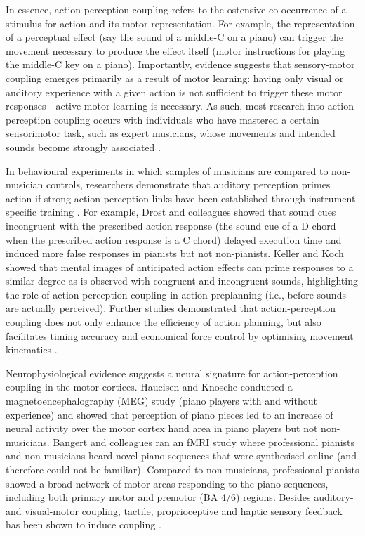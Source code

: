 \begin{CJK}{UTF8}{gbsn}
In essence, action-perception coupling refers to the ostensive co-occurrence of a stimulus for action and its motor representation.  For example, the representation of a perceptual effect (say the sound of a middle-C on a piano) can trigger the movement necessary to produce the effect itself (motor instructions for playing the middle-C key on a piano).   Importantly, evidence suggests that sensory-motor coupling emerges primarily as a result of motor learning: having only visual \citep{Candidi2014} or auditory \citep{Lahav2007} experience with a given action is not sufficient to trigger these motor responses—active motor learning is necessary.  As such, most research into action-perception coupling occurs with individuals who have mastered a certain sensorimotor task, such as expert musicians, whose movements and intended sounds become strongly associated \citep{Novembre2014}.

In behavioural experiments in which samples of musicians are compared to non-musician controls, researchers demonstrate that auditory perception primes action if strong action-perception links have been established through instrument-specific training \citep{Drost2005,Drost2005a,Drost2007}.  For example, Drost and colleagues showed that sound cues incongruent with the prescribed action response (the sound cue of a D chord when the prescribed action response is a C chord) delayed execution time \citep{Drost2005} and induced more false responses \citep[i.e., production of the heard chord, instead of the imperative one,][]{Drost2005a} in pianists but not non-pianists.  Keller and Koch \textcite{Keller2006} showed that mental images of anticipated action effects can prime responses to a similar degree as is observed with congruent and incongruent sounds, highlighting the role of action-perception coupling in action preplanning (i.e., before sounds are actually perceived).  Further studies demonstrated that action-perception coupling does not only enhance the efficiency of action planning, but also facilitates timing accuracy and economical force control by optimising movement kinematics \citep{Keller2010}.

Neurophysiological evidence suggests a neural signature for action-perception coupling in the motor cortices.  Haueisen and Knosche \citep{Haueisen2001} conducted a magnetoencephalography (MEG) study (piano players with and without experience) and showed that perception of piano pieces led to an increase of neural activity over the motor cortex hand area in piano players but not non-musicians.  Bangert and colleagues \textcite{Bangert2006} ran an fMRI study where professional pianists and non-musicians heard novel piano sequences that were synthesised online (and therefore could not be familiar).  Compared to non-musicians, professional pianists showed a broad network of motor areas responding to the piano sequences, including both primary motor and premotor (BA 4/6) regions.  Besides auditory- and visual-motor coupling, tactile, proprioceptive and haptic sensory feedback has been shown to induce coupling \citep{Schulz2003,Kuchenbuch2014}.


\end{CJK}
